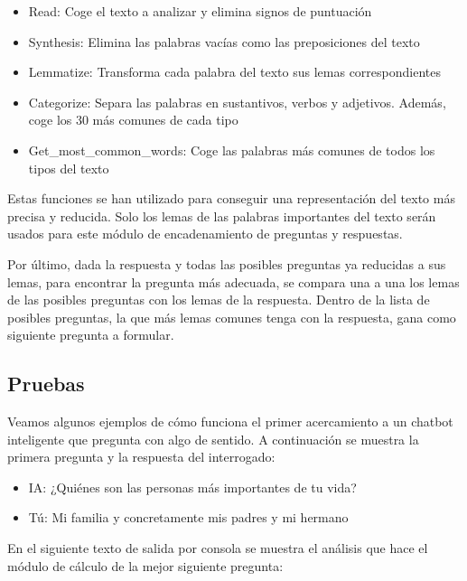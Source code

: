\begin{itemize}
	\item Read: Coge el texto a analizar y elimina signos de puntuación
	\item Synthesis: Elimina las palabras vacías como las preposiciones del texto
	\item Lemmatize: Transforma cada palabra del texto sus lemas correspondientes
	\item Categorize: Separa las palabras en sustantivos, verbos y adjetivos. Además, coge los 30 más comunes de cada tipo
	\item Get\_most\_common\_words: Coge las palabras más comunes de todos los tipos del texto
\end{itemize}

Estas funciones se han utilizado para conseguir una representación del texto más precisa y reducida. Solo los lemas de las palabras importantes del texto serán usados para este módulo de encadenamiento de preguntas y respuestas.

Por último, dada la respuesta y todas las posibles preguntas ya reducidas a sus lemas, para encontrar la pregunta más adecuada, se compara una a una los lemas de las posibles preguntas con los lemas de la respuesta. Dentro de la lista de posibles preguntas, la que más lemas comunes tenga con la respuesta, gana como siguiente pregunta a formular.

\subsection{Pruebas}
Veamos algunos ejemplos de cómo funciona el primer acercamiento a un chatbot inteligente que pregunta con algo de sentido. A continuación se muestra la primera pregunta y la respuesta del interrogado:

\begin{itemize}
	\item[] IA: ¿Quiénes son las personas más importantes de tu vida?
	\item[] Tú: Mi familia y concretamente mis padres y mi hermano
\end{itemize}

En el siguiente texto de salida por consola se muestra el análisis que hace el módulo de cálculo de la mejor siguiente pregunta:

